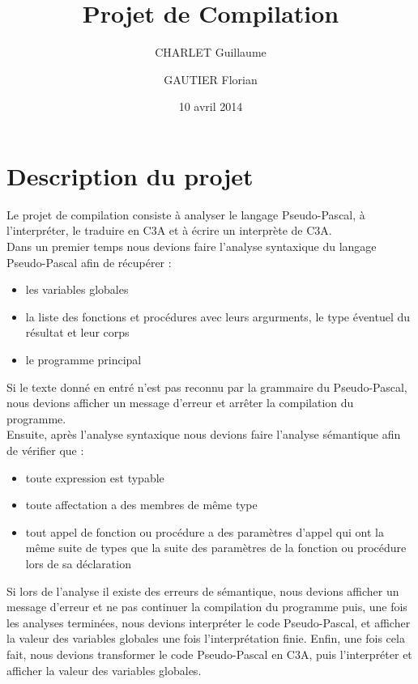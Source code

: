 \documentclass{report}
\title{Projet de Compilation}
\author{CHARLET Guillaume \and GAUTIER Florian}
\date{10 avril 2014}
\begin{document}
\maketitle

\tableofcontents

\newpage

\section{Description du projet}
Le projet de compilation consiste à analyser le langage Pseudo-Pascal, à l’interpréter, le traduire en C3A et à écrire un interprète de C3A.\\

Dans un premier temps nous devions faire l'analyse syntaxique du langage Pseudo-Pascal afin de récupérer :
\begin{itemize}
\item les variables globales
\item la liste des fonctions et procédures avec leurs argurments, le type éventuel du résultat et leur corps
\item le programme principal
\end{itemize}

Si le texte donné en entré n'est pas reconnu par la grammaire du Pseudo-Pascal, nous devions afficher un message d'erreur et arrêter la compilation du programme.\\

Ensuite, après l'analyse syntaxique nous devions faire l'analyse sémantique afin de vérifier que :
\begin{itemize}
\item toute expression est typable
\item toute affectation a des membres de même type
\item tout appel de fonction ou procédure a des paramètres d'appel qui ont la même suite de types que la suite des paramètres de la fonction ou procédure lors de sa déclaration
\end{itemize}

Si lors de l'analyse il existe des erreurs de sémantique, nous devions afficher un message d'erreur et ne pas continuer la compilation du programme puis, 
une fois les analyses terminées, nous devions interpréter le code Pseudo-Pascal, et afficher la valeur des variables globales une fois l'interprétation finie.
Enfin, une fois cela fait, nous devions transformer le code Pseudo-Pascal en C3A, puis l'interpréter et afficher la valeur des variables globales.\\
\end{document}
